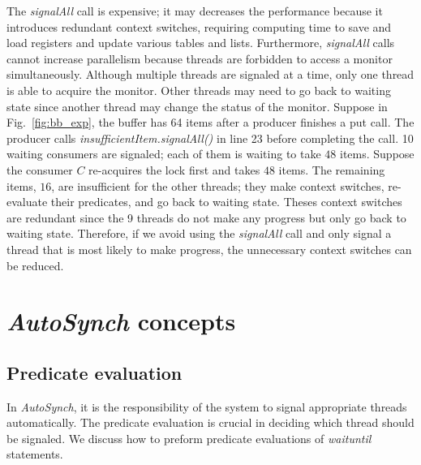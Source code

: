 \documentclass{sigplanconf}
\begin{document}
The {\em signalAll} call is expensive; it may decreases the performance because 
it introduces redundant context switches, requiring 
computing time to save and load registers and update various tables and lists.
Furthermore, {\em signalAll} calls cannot increase parallelism because threads
are forbidden to access a monitor simultaneously. Although multiple threads are
signaled at a time, only one thread is able to acquire the monitor. Other 
threads may need to go back to waiting state since another thread may change 
the status of the monitor. Suppose in Fig.~\ref{fig:bb_exp}, the 
buffer has 64 items after a producer finishes a put call. The producer calls 
{\em insufficientItem.signalAll()} in line 23 before completing the call. 10  
waiting consumers are signaled; each of them is waiting to take $48$ items.
Suppose the consumer $C$ re-acquires the lock first and takes $48$ items. The
remaining items, $16$, are insufficient for the other threads; they
make context switches, re-evaluate their predicates, and go back to waiting 
state. Theses context switches are redundant since the 9 threads do not 
make any progress but only go back to waiting state. 
Therefore, if we avoid using the {\em signalAll} call and only signal a thread that 
is most likely to make progress, the unnecessary context switches can be
reduced.



\section{{\em AutoSynch} concepts} \label{sec:concept}


\subsection{Predicate evaluation} \label{sec:globalization}
In {\em AutoSynch}, it is the responsibility of the system to signal appropriate 
threads automatically. The predicate evaluation is crucial in deciding which
thread should be signaled. We discuss how to preform predicate evaluations
of {\em waituntil} statements. 
\end{document}
